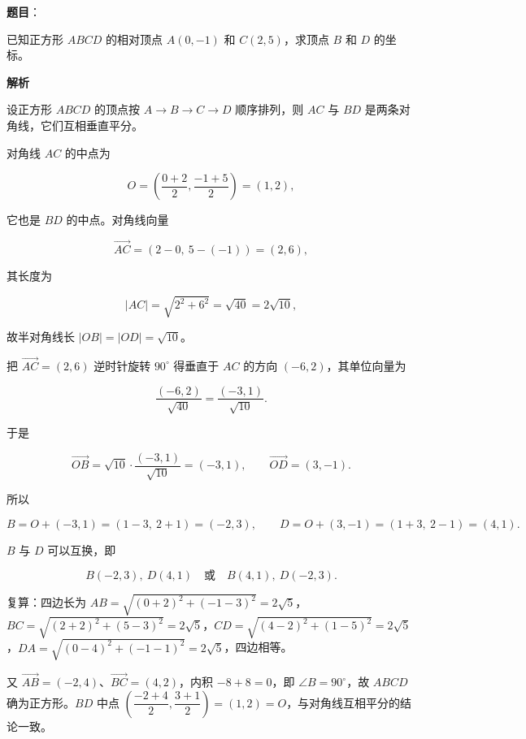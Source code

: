 \begin{answer}

\textbf{题目}：

已知正方形 $ABCD$ 的相对顶点 $A(0,-1)$ 和 $C(2,5)$，求顶点 $B$ 和 $D$ 的坐标。

\textbf{解析}

设正方形 $ABCD$ 的顶点按 $A\to B\to C\to D$ 顺序排列，则 $AC$ 与 $BD$ 是两条对角线，它们互相垂直平分。

对角线 $AC$ 的中点为

\nopagebreak[4]
\[
O=\left(\frac{0+2}{2},\frac{-1+5}{2}\right)=(1,2),
\]

它也是 $BD$ 的中点。对角线向量

\nopagebreak[4]
\[
\overrightarrow{AC}=(2-0,\ 5-(-1))=(2,6),
\]

其长度为

\nopagebreak[4]
\[
\lvert AC\rvert=\sqrt{2^2+6^2}=\sqrt{40}=2\sqrt{10},
\]

故半对角线长 $\lvert OB\rvert=\lvert OD\rvert=\sqrt{10}$。

把 $\overrightarrow{AC}=(2,6)$ 逆时针旋转 $90^\circ$ 得垂直于 $AC$ 的方向 $(-6,2)$，其单位向量为

\nopagebreak[4]
\[
\frac{(-6,2)}{\sqrt{40}}=\frac{(-3,1)}{\sqrt{10}}.
\]

于是

\nopagebreak[4]
\[
\overrightarrow{OB}=\sqrt{10}\cdot\frac{(-3,1)}{\sqrt{10}}=(-3,1),\qquad
\overrightarrow{OD}=(3,-1).
\]

所以

\nopagebreak[4]
\[
B=O+(-3,1)=(1-3,\ 2+1)=(-2,3),\qquad
D=O+(3,-1)=(1+3,\ 2-1)=(4,1).
\]

$B$ 与 $D$ 可以互换，即

\nopagebreak[4]
\[
B(-2,3),\ D(4,1)\quad\text{或}\quad B(4,1),\ D(-2,3).
\]

复算：四边长为 $AB=\sqrt{(0+2)^2+(-1-3)^2}=2\sqrt5$，$BC=\sqrt{(2+2)^2+(5-3)^2}=2\sqrt5$，$CD=\sqrt{(4-2)^2+(1-5)^2}=2\sqrt5$，$DA=\sqrt{(0-4)^2+(-1-1)^2}=2\sqrt5$，四边相等。

又 $\overrightarrow{AB}=(-2,4)$、$\overrightarrow{BC}=(4,2)$，内积 $-8+8=0$，即 $\angle B=90^\circ$，故 $ABCD$ 确为正方形。$BD$ 中点 $\left(\dfrac{-2+4}{2},\dfrac{3+1}{2}\right)=(1,2)=O$，与对角线互相平分的结论一致。


\end{answer}
